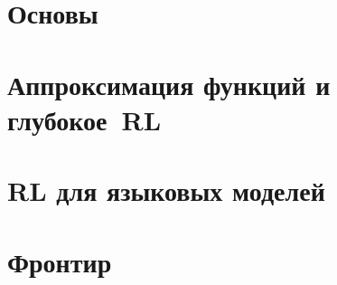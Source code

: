 \documentclass[oneside,openany]{book}
\theoremstyle{definition}
\theoremstyle{plain}
\theoremstyle{remark}
\begin{document}
\part{Основы}







\part{Аппроксимация функций и глубокое~RL}




\part{RL для языковых моделей}






\part{Фронтир}




\appendix


\backmatter



\printindex
\end{document}
